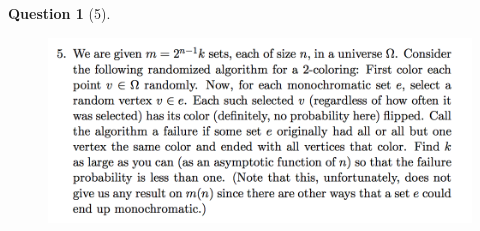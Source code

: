 \documentclass{article} %
\theoremstyle{quest}
\newtheorem*{question}{Question}
\begin{document}
\newpage

\begin{question}[5]
\hfill
\begin{figure}[h!]
  \centering
    \includegraphics[width=1\textwidth]{PM-2-5.png}
\end{figure}
\end{question}
\end{document}
